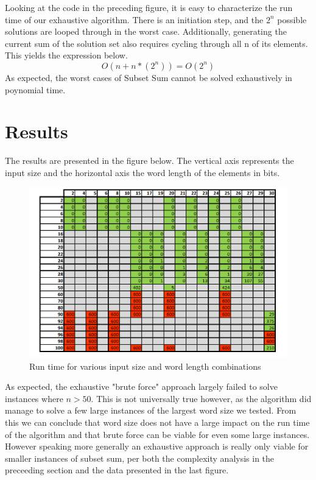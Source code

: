 \documentclass{article}
\begin{document}
Looking at the code in the preceding figure, it is easy to characterize the run time of our exhaustive algorithm.
There is an initiation step, and the $2^{n}$ possible solutions are looped through in the worst case. 
Additionally, generating the current sum of the solution set also requires cycling through all n of its elements. 
This yields the expression below.
$$O(n + n*(2^{n})) = O(2^{n})$$
As expected, the worst cases of Subset Sum cannot be solved exhaustively in poynomial time.


\section{Results}

The results are presented in the figure below. The vertical axis represents the
input size and the horizontal axis the word length of the elements in bits.

\begin{figure}[h]
\centering
\includegraphics[width=12cm]{P1_res.png}
\caption{Run time for various input size and word length combinations}
\end{figure}

As expected, the exhaustive "brute force" approach largely failed to solve
instances where $n > 50$. This is not universally true however, as the algorithm
did manage to solve a few large instances of the largest word size we tested. From 
this we can conclude that word size does not have a large impact on the run time of
the algorithm and that brute force can be viable for even some large instances.
However speaking more generally an exhaustive approach is really only viable for
smaller instances of subset sum, per both the complexity analysis in the preceeding
section and the data presented in the last figure.





\end{document}
